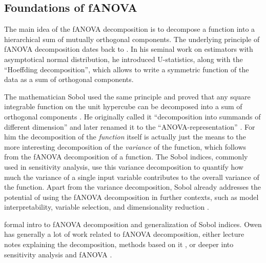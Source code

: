 
\subsection*{Foundations of fANOVA}
The main idea of the fANOVA decomposition is to decompose a function into a hierarchical sum of mutually orthogonal components.
The underlying principle of fANOVA decomposition dates back to \cite{hoeffding1948}. In his seminal work on estimators with asymptotical normal distribution, he introduced U-statistics, along with the ``Hoeffding decomposition'', which allows to write a symmetric function of the data as a sum of orthogonal components.\par
The mathematician Sobol used the same principle and proved that any square integrable function on the unit hypercube can be decomposed into a sum of orthogonal components \citep{sobol1993sensitivity}.
He originally called it ``decomposition into summands of different dimension'' and later renamed it to the ``ANOVA-representation'' \citep{sobol2001}. For him the decomposition of the \textit{function} itself is actually just the means to the more interesting decomposition of the \textit{variance} of the function, which follows from the fANOVA decomposition of a function.
The Sobol indices, commonly used in sensitivity analysis, use this variance decomposition to quantify how much the variance of a single input variable contributes to the overall variance of the function.
Apart from the variance decomposition, Sobol already addresses the potential of using the fANOVA decomposition in further contexts, such as model interpretability, variable selection, and dimensionality reduction \cite{sobol2001}.\par

\cite{owen2013} formal intro to fANOVA decomposition and generalization of Sobol indices.
Owen has generally a lot of work related to fANOVA decomposition, either lecture notes explaining the decomposition, methods based on it \cite{owen2003}, or deeper into sensitivity analysis and fANOVA \cite{owen2013}.


